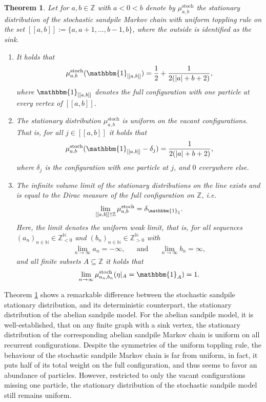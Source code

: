 \documentclass[11pt]{article}
\newtheorem{theorem}{Theorem}[section]
\newcommand{\N}{\mathbb{N}}
\newcommand{\Z}{\mathbb{Z}}
\newcommand{\stoch}{\text{stoch}}
\newcommand{\stat}[2]{\mu^{\stoch}_{#1,#2}}
\newcommand{\one}{\mathbbm{1}}
\begin{document}
\begin{theorem}\label{thm:main}
    Let for $a,b\in\Z$ with $a<0<b$ denote by $\stat{a}{b}$ the stationary distribution of the stochastic sandpile Markov chain with uniform toppling rule on the set $[[a,b]]:=\{a,a+1,...,b-1,b\}$, where the outside is identified as the sink.
    
    \begin{enumerate}[label=(USS\arabic*),leftmargin=*]
        \item It holds that
        $$\stat{a}{b}(\mathbbm{1}_{[[a,b]]})=\frac{1}{2}+\frac{1}{2(|a|+b+2)},$$
        where $\one_{[[a,b]]}$ denotes the full configuration with one particle at every vertex of $[[a,b]]$.\label{USS1}

        \item The stationary distribution $\stat{a}{b}$ is uniform on the vacant configurations. That is, for all $j\in[[a,b]]$ it holds that
        $$\stat{a}{b}(\mathbbm{1}_{[[a,b]]}-\delta_j)=\frac{1}{2(|a|+b+2)},$$
        where $\delta_j$ is the configuration with one particle at $j$, and $0$ everywhere else.\label{USS2}

        \item The infinite volume limit of the stationary distributions on the line exists and is equal to the Dirac measure of the full configuration on $\Z$, i.e.
        $$\lim_{[[a,b]]\uparrow \Z}\stat{a}{b}=\delta_{\mathbbm{1}_\Z}.$$
        Here, the limit denotes the uniform weak limit, that is, for all sequences $(a_n)_{n\in\N}\in\Z_{<0}^\N$ and $(b_n)_{n\in\N}\in\Z_{>0}^\N$ with
        \begin{align*}
            \lim_{n\rightarrow\infty}a_n=-\infty,&&\text{and}&&\lim_{n\rightarrow\infty}b_n=\infty,
        \end{align*}
        and all finite subsets $A\subseteq\Z$ it holds that
        $$\lim_{n\rightarrow\infty}\stat{a_n}{b_n}(\eta|_A=\mathbbm{1}_A)=1.$$\label{USS3}
        \end{enumerate}
\end{theorem}
Theorem \ref{thm:main} shows a remarkable difference between the stochastic sandpile stationary distribution, and its deterministic counterpart, the stationary distribution of the abelian sandpile model. For the abelian sandpile model, it is well-established, that on any finite graph with a sink vertex, the stationary distribution of the corresponding abelian sandpile Markov chain is uniform on all recurrent configurations. Despite the symmetries of the uniform toppling rule, the behaviour of the stochastic sandpile Markov chain is far from uniform, in fact, it puts half of its total weight on the full configuration, and thus seems to favor an abundance of particles. However, restricted to only the vacant configurations missing one particle, the stationary distribution of the stochastic sandpile model still remains uniform.
\end{document}
